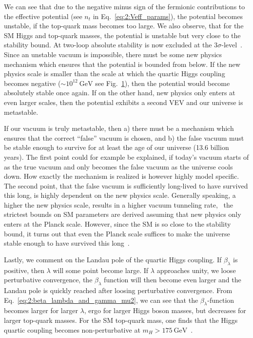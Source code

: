 \begin{figure}[h]
\begin{minipage}[t]{0.48\textwidth}
  \label{fig:2:running_couplings}
  \end{minipage}
\end{figure}
We can see that due to the negative minus sign of the fermionic contributions to the effective potential (see $n_t$ in Eq.~\eqref{eq:2:Veff_params}), the potential becomes unstable, if the top-quark mass becomes too large. We also observe, that for the \acs{SM} Higgs and top-quark masses, the potential is unstable but very close to the stability bound. At two-loop absolute stability is now excluded at the $3\sigma$-level~\cite{Degrassi:2012ry}. Since an unstable vacuum is impossible, there must be some new physics mechanism which ensures that the potential is bounded from below. If the new physics scale is smaller than the scale at which the quartic Higgs coupling becomes negative ($\sim 10^{12}\ \mathrm{GeV}$ see Fig.~\ref{fig:2:running_couplings}), then the potential would become absolutely stable once again. If on the other hand, new physics only enters at even larger scales, then the potential exhibits a second \acs{VEV} and our universe is metastable.

If our vacuum is truly metastable, then a) there must be a mechanism which ensures that the correct ``false'' vacuum is chosen, and b) the false vacuum must be stable enough to survive for at least the age of our universe (13.6 billion years). The first point could for example be explained, if today's vacuum starts of as the true vacuum and only becomes the false vacuum as the universe cools down. How exactly the mechanism is realized is however highly model specific. The second point, that the false vacuum is sufficiently long-lived to have survived this long, is highly dependent on the new physics scale. Generally speaking, a higher the new physics scale, results in a higher vacuum tunneling rate, \ie\ the strictest bounds on \acs{SM} parameters are derived assuming that new physics only enters at the Planck scale. However, since the \acs{SM} is so close to the stability bound, it turns out that even the Planck scale suffices to make the universe stable enough to have survived this long~\cite{Degrassi:2012ry}.

Lastly, we comment on the Landau pole of the quartic Higgs coupling. If $\beta_\lambda$ is positive, then $\lambda$ will some point become large. If $\lambda$ approaches unity, we loose perturbative convergence, the $\beta_\lambda$ function will then become even larger and the Landau pole is quickly reached after loosing perturbative convergence. From  Eq.~\eqref{eq:2:beta_lambda_and_gamma_mu2}, we can see that the $\beta_\lambda$-function becomes larger for larger $\lambda$, ergo for larger Higgs boson masses, but decreases for larger top-quark masses. For the \acs{SM} top-quark mass, one finds that the Higgs quartic coupling becomes non-perturbative at $m_H > 175\ \mathrm{GeV}$~\cite{Degrassi:2012ry}.
